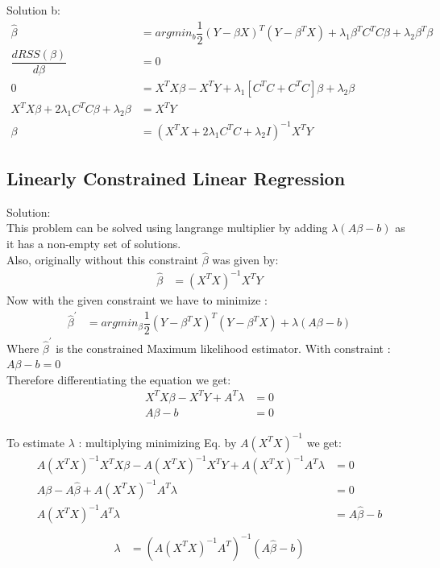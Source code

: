 \documentclass[paper=a4, fontsize=11pt]{scrartcl} %
\numberwithin{equation}{section} %
\numberwithin{figure}{section} %
\numberwithin{table}{section} %
\begin{document}
Solution b:\\
\begin{align*}
\hat{\beta} &= argmin_{b} \dfrac{1}{2}(Y-\beta X)^{T}(Y-\beta^{T} X) + \lambda_{1}\beta^{T} C^{T}C\beta + \lambda_{2}\beta^{T}\beta\\
\dfrac{dRSS(\beta)}{d\beta} &= 0\\
0 &= X^{T}X\beta - X^{T}Y + \lambda_{1}[C^{T}C + C^{T}C]\beta + \lambda_{2}\beta\\
X^{T}X\beta + 2\lambda_{1}C^{T}C\beta + \lambda_{2}\beta &= X^{T}Y\\
\beta &= (X^{T}X + 2\lambda_{1}C^{T}C + \lambda_{2}I)^{-1}X^{T}Y
\end{align*}
\endgroup


\subsection{Linearly Constrained Linear Regression}
\begingroup
Solution:\\
This problem can be solved using langrange multiplier by adding $\lambda (A\beta - b)$ as it has a non-empty set of solutions.\\
Also, originally without this constraint $\hat{\beta}$ was given by:
\begin{align}
\hat{\beta} &= (X^{T}X)^{-1}X^{T}Y
\end{align}
Now with the given constraint we have to minimize :
\begin{align}
\hat{\beta}^{'} &= argmin_{\beta} \dfrac{1}{2}(Y-\beta^{T}X)^{T}(Y-\beta^{T}X) + \lambda(A\beta -b)
\end{align}
Where $\hat{\beta}^{'}$ is the constrained Maximum likelihood estimator. With constraint : $A\beta - b = 0$\\

Therefore differentiating the equation we get:
\begin{align}
X^{T}X\beta - X^{T}Y + A^{T}\lambda &= 0\\
A\beta - b &= 0
\end{align}

To estimate $\lambda$ : multiplying minimizing Eq. by $A(X^{T}X)^{-1}$ we get:\\
\begin{align*}
A(X^{T}X)^{-1}X^{T}X\beta  - A(X^{T}X)^{-1}X^{T}Y + A(X^{T}X)^{-1}A^{T}\lambda &= 0\\
A\beta - A\hat{\beta} + A(X^{T}X)^{-1}A^{T}\lambda &= 0\\
A(X^{T}X)^{-1}A^{T}\lambda &= A\hat{\beta} - b\\
\end{align*}
\begin{align}
\lambda &= (A(X^{T}X)^{-1}A^{T})^{-1}(A\hat{\beta} - b)
\end{align}
\end{document}
